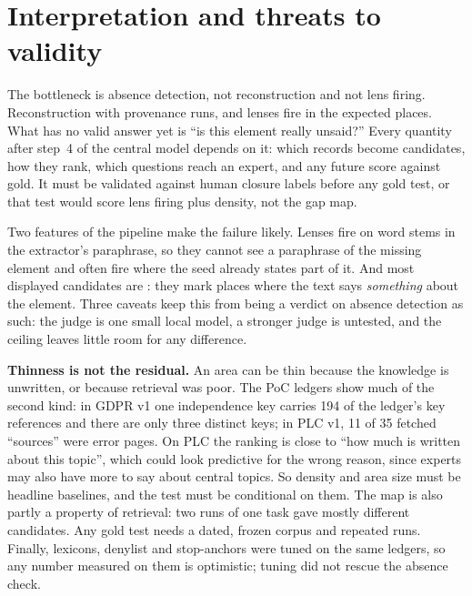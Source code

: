 \section{Interpretation and threats to validity}\label{sec:interpretation}

\begin{evintbox}
  The bottleneck is absence detection, not reconstruction and not lens firing. Reconstruction with
  provenance runs, and lenses fire in the expected places. What has no valid answer yet is \enquote{is
  this element really unsaid?} Every quantity after step~4 of the central model depends on it: which
  records become candidates, how they rank, which questions reach an expert, and any future score
  against gold. It must be validated against human closure labels before any gold test, or that test
  would score lens firing plus density, not the gap map.
\end{evintbox}

\evint{} Two features of the pipeline make the failure likely. Lenses fire on word stems in the
extractor's paraphrase, so they cannot see a paraphrase of the missing element and often fire where
the seed already states part of it. And most displayed candidates are : they mark places
where the text says \emph{something} about the element. Three caveats keep this from being a verdict on
absence detection as such: the judge is one small local model, a stronger judge is untested, and the
ceiling leaves little room for any difference.

\evint{} \textbf{Thinness is not the residual.} An area can be thin because the knowledge is unwritten,
or because retrieval was poor. \evobs{} The PoC ledgers show much of the second kind: in GDPR v1 one
independence key carries 194 of the ledger's key references and there are only three distinct keys; in
PLC v1, 11 of 35 fetched \enquote{sources} were error pages. \evint{} On PLC the ranking is close to
\enquote{how much is written about this topic}, which could look predictive for the wrong reason, since
experts may also have more to say about central topics. So density and area size must be headline
baselines, and the test must be conditional on them. The map is also partly a property of retrieval:
two runs of one task gave mostly different candidates. Any gold test needs a dated, frozen corpus and
repeated runs. Finally, lexicons, denylist and stop-anchors were tuned on the same ledgers, so any number
measured on them is optimistic; tuning did not rescue the absence check.


